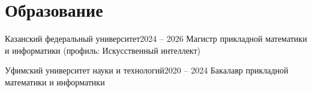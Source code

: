 \section{Образование}
    \resumeSubHeadingListStart
    \resumeSubheading
    {Казанский федеральный университет}{2024 -- 2026}
    {Магистр прикладной математики и информатики (профиль: Искусственный интеллект)}{}

    \resumeSubheading
    {Уфимский университет науки и технологий}{2020 -- 2024}
    {Бакалавр прикладной математики и информатики}{}

    \resumeSubHeadingListEnd
